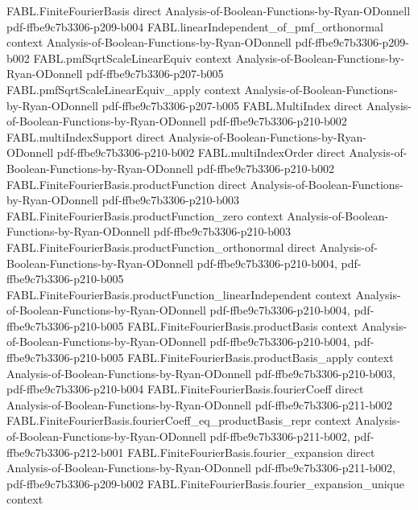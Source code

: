 \begin{theorem}
\proofstep
  {FABL.FiniteFourierBasis}
  {direct}
  {Analysis-of-Boolean-Functions-by-Ryan-ODonnell}
  {pdf-ffbe9c7b3306-p209-b004}
\proofstep
  {FABL.linearIndependent_of_pmf_orthonormal}
  {context}
  {Analysis-of-Boolean-Functions-by-Ryan-ODonnell}
  {pdf-ffbe9c7b3306-p209-b002}
\proofstep
  {FABL.pmfSqrtScaleLinearEquiv}
  {context}
  {Analysis-of-Boolean-Functions-by-Ryan-ODonnell}
  {pdf-ffbe9c7b3306-p207-b005}
\proofstep
  {FABL.pmfSqrtScaleLinearEquiv_apply}
  {context}
  {Analysis-of-Boolean-Functions-by-Ryan-ODonnell}
  {pdf-ffbe9c7b3306-p207-b005}
\proofstep
  {FABL.MultiIndex}
  {direct}
  {Analysis-of-Boolean-Functions-by-Ryan-ODonnell}
  {pdf-ffbe9c7b3306-p210-b002}
\proofstep
  {FABL.multiIndexSupport}
  {direct}
  {Analysis-of-Boolean-Functions-by-Ryan-ODonnell}
  {pdf-ffbe9c7b3306-p210-b002}
\proofstep
  {FABL.multiIndexOrder}
  {direct}
  {Analysis-of-Boolean-Functions-by-Ryan-ODonnell}
  {pdf-ffbe9c7b3306-p210-b002}
\proofstep
  {FABL.FiniteFourierBasis.productFunction}
  {direct}
  {Analysis-of-Boolean-Functions-by-Ryan-ODonnell}
  {pdf-ffbe9c7b3306-p210-b003}
\proofstep
  {FABL.FiniteFourierBasis.productFunction_zero}
  {context}
  {Analysis-of-Boolean-Functions-by-Ryan-ODonnell}
  {pdf-ffbe9c7b3306-p210-b003}
\proofstep
  {FABL.FiniteFourierBasis.productFunction_orthonormal}
  {direct}
  {Analysis-of-Boolean-Functions-by-Ryan-ODonnell}
  {pdf-ffbe9c7b3306-p210-b004,
    pdf-ffbe9c7b3306-p210-b005}
\proofstep
  {FABL.FiniteFourierBasis.productFunction_linearIndependent}
  {context}
  {Analysis-of-Boolean-Functions-by-Ryan-ODonnell}
  {pdf-ffbe9c7b3306-p210-b004,
    pdf-ffbe9c7b3306-p210-b005}
\proofstep
  {FABL.FiniteFourierBasis.productBasis}
  {context}
  {Analysis-of-Boolean-Functions-by-Ryan-ODonnell}
  {pdf-ffbe9c7b3306-p210-b004,
    pdf-ffbe9c7b3306-p210-b005}
\proofstep
  {FABL.FiniteFourierBasis.productBasis_apply}
  {context}
  {Analysis-of-Boolean-Functions-by-Ryan-ODonnell}
  {pdf-ffbe9c7b3306-p210-b003,
    pdf-ffbe9c7b3306-p210-b004}
\proofstep
  {FABL.FiniteFourierBasis.fourierCoeff}
  {direct}
  {Analysis-of-Boolean-Functions-by-Ryan-ODonnell}
  {pdf-ffbe9c7b3306-p211-b002}
\proofstep
  {FABL.FiniteFourierBasis.fourierCoeff_eq_productBasis_repr}
  {context}
  {Analysis-of-Boolean-Functions-by-Ryan-ODonnell}
  {pdf-ffbe9c7b3306-p211-b002,
    pdf-ffbe9c7b3306-p212-b001}
\proofstep
  {FABL.FiniteFourierBasis.fourier_expansion}
  {direct}
  {Analysis-of-Boolean-Functions-by-Ryan-ODonnell}
  {pdf-ffbe9c7b3306-p211-b002,
    pdf-ffbe9c7b3306-p209-b002}
\proofstep
  {FABL.FiniteFourierBasis.fourier_expansion_unique}
  {context}

\end{theorem}
